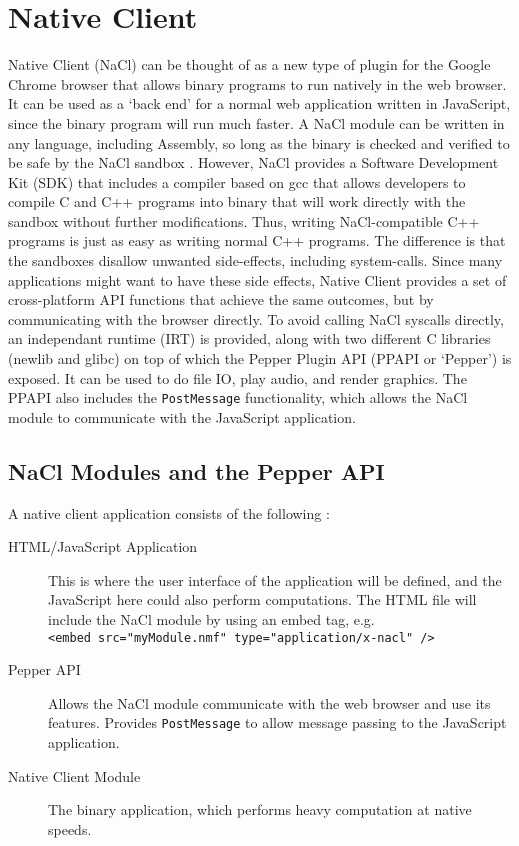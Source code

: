 \section{Native Client}
Native Client (NaCl) can be thought of as a new type of plugin for the Google Chrome browser that allows binary programs to run natively in the web browser. It can be used as a `back end' for a normal web application written in JavaScript, since the binary program will run much faster. A NaCl module can be written in any language, including Assembly, so long as the binary is checked and verified to be safe by the NaCl sandbox \cite{nacl}. However, NaCl provides a Software Development Kit (SDK) that includes a compiler based on gcc that allows developers to compile C and C++ programs into binary that will work directly with the sandbox without further modifications. Thus, writing NaCl-compatible C++ programs is just as easy as writing normal C++ programs. The difference is that the sandboxes disallow unwanted side-effects, including system-calls. Since many applications might want to have these side effects, Native Client provides a set of cross-platform API functions that achieve the same outcomes, but by communicating with the browser directly. To avoid calling NaCl syscalls directly, an independant runtime (IRT) is provided, along with two different C libraries (newlib and glibc) on top of which the Pepper Plugin API (PPAPI or `Pepper') is exposed. It can be used to do file IO, play audio, and render graphics. The PPAPI also includes the \lstinline+PostMessage+ functionality, which allows the NaCl module to communicate with the JavaScript application.

\subsection{NaCl Modules and the Pepper API}
A native client application consists of the following \cite{nacloverview}:
\begin{description}
  \item[HTML/JavaScript Application] 
  This is where the user interface of the application will be defined, and the   JavaScript here could also perform computations. The HTML file will include   the NaCl module by using an embed tag, e.g. \\
   \lstinline+<embed src="myModule.nmf" type="application/x-nacl" />+
  \item[Pepper API] 
  Allows the NaCl module communicate with the web browser and use its features. Provides \lstinline+PostMessage+ to allow message passing to the JavaScript application.
  \item[Native Client Module] 
  The binary application, which performs heavy computation at native speeds.
\end{description}

